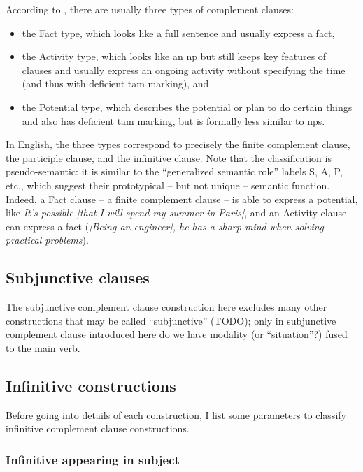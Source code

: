 \documentclass[UTF8, a4paper, oneside, scheme=plain, 12pt]{ctexbook}
\newcommand*{\citesec}[1]{\S~{#1}}
\newcommand{\form}[1]{\emph{#1}}
\begin{document}
According to \citet[\citesec{18.4}]{dixon2010basic2},
there are usually three types of complement clauses:
\begin{itemize}
    \item the Fact type, which looks like a full sentence
    and usually express a fact, 
    \item the Activity type, which looks like an \acs{np}
    but still keeps key features of clauses 
    and usually express an ongoing activity 
    without specifying the time (and thus with deficient \acs{tam} marking), and 
    \item the Potential type,
    which describes the potential or plan to do certain things 
    and also has deficient \acs{tam} marking,
    but is formally less similar to \acs{np}s.
\end{itemize}
In English, the three types correspond to precisely 
the finite complement clause,
the participle clause,
and the infinitive clause.
Note that the classification is pseudo-semantic:
it is similar to the ``generalized semantic role'' labels S, A, P, etc.,
which suggest their prototypical -- but not unique -- semantic function.
Indeed, a Fact clause -- a finite complement clause -- 
is able to express a potential,
like \form{It's possible [that I will spend my summer in Paris]},
and an Activity clause can express a fact 
(\form{[Being an engineer], he has a sharp mind when solving practical problems}).

\subsection{Subjunctive clauses}\label{sec:complement.subjunctive}

The subjunctive complement clause construction here 
excludes many other constructions that may be called ``subjunctive'' (TODO);
only in subjunctive complement clause introduced here 
do we have modality (or ``situation''?) fused to the main verb.

\subsection{Infinitive constructions}

Before going into details of each construction,
I list some parameters to classify infinitive complement clause constructions.

\subsubsection{Infinitive appearing in subject}
\end{document}
